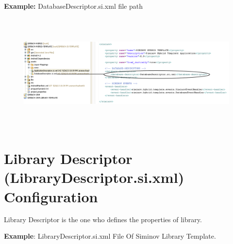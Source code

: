 	\par
		\textbf{Example:} DatabaseDescriptor.si.xml file path
		\begin{figure}[htbp]
			\centering
				\includegraphics[height=6cm]{Resources/siminov_hybrid_template_application_database_descriptor_path_example.png}
		\end{figure}




\newpage
\section{Library Descriptor (LibraryDescriptor.si.xml) Configuration}
	Library Descriptor is the one who defines the properties of library.



\textbf{Example}: LibraryDescriptor.si.xml File Of Siminov Library Template.


